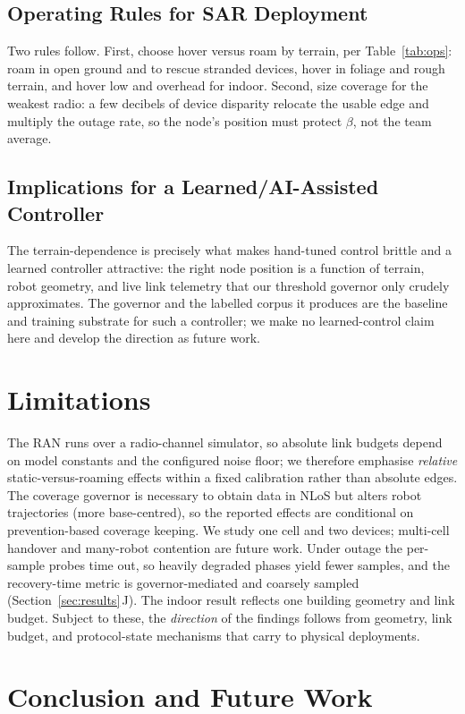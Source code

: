 \documentclass[conference]{IEEEtran}
\begin{document}
\subsection{Operating Rules for SAR Deployment}
Two rules follow. First, choose hover versus roam by terrain, per
Table~\ref{tab:ops}: roam in open ground and to rescue stranded devices, hover in
foliage and rough terrain, and hover low and overhead for indoor. Second, size
coverage for the weakest radio: a few decibels of device disparity relocate the usable
edge and multiply the outage rate, so the node's position must protect $\beta$, not the
team average.

\subsection{Implications for a Learned/AI-Assisted Controller}
The terrain-dependence is precisely what makes hand-tuned control brittle and a learned
controller attractive: the right node position is a function of terrain, robot
geometry, and live link telemetry that our threshold governor only crudely
approximates. The governor and the labelled corpus it produces are the baseline and
training substrate for such a controller; we make no learned-control claim here and
develop the direction as future work.

\section{Limitations}
\label{sec:limitations}
The RAN runs over a radio-channel simulator, so absolute link budgets depend on model
constants and the configured noise floor; we therefore emphasise \emph{relative}
static-versus-roaming effects within a fixed calibration rather than absolute edges.
The coverage governor is necessary to obtain data in NLoS but alters robot
trajectories (more base-centred), so the reported effects are conditional on
prevention-based coverage keeping. We study one cell and two devices; multi-cell
handover and many-robot contention are future work. Under outage the per-sample probes
time out, so heavily degraded phases yield fewer samples, and the recovery-time metric
is governor-mediated and coarsely sampled (Section~\ref{sec:results}\,J). The indoor
result reflects one building geometry and link budget. Subject to these, the
\emph{direction} of the findings follows from geometry, link budget, and protocol-state
mechanisms that carry to physical deployments.

\section{Conclusion and Future Work}
\label{sec:conclusion}
\end{document}
